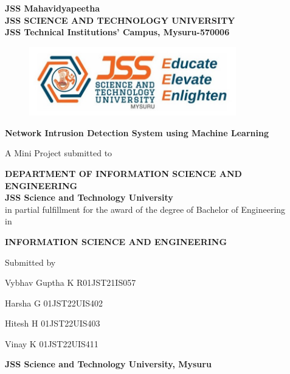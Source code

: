 \thispagestyle{empty}
\begin{center}
    { \large {\bfseries {JSS Mahavidyapeetha \\
    JSS SCIENCE AND TECHNOLOGY UNIVERSITY \\
    JSS Technical Institutions’ Campus, Mysuru-570006} \par}}
    
    \vspace{2\baselineskip}
    {\begin{figure}[!h] 
	\centering
	\includegraphics[width=90mm]{images/jssstu_logo.jpg} 
     \end{figure}
    }

\vspace{2\baselineskip}
    {\Large \textbf{Network Intrusion Detection System using Machine Learning} \par}

\vspace{2\baselineskip}
    {\small{A Mini Project submitted to} \par}
\vspace{0.5\baselineskip}
    {\small\textbf{DEPARTMENT OF INFORMATION SCIENCE AND ENGINEERING \\ JSS Science and Technology University}\\
    \vspace{1\baselineskip}
    \small{in partial fulfillment for the award of the degree of Bachelor of Engineering\\in}}\par
\vspace{0.5\baselineskip}
    {\large \bf {INFORMATION SCIENCE AND ENGINEERING} \par} 

\vspace{1\baselineskip}
    {{Submitted by} \par}

\vspace{\baselineskip}
    {{\large { Vybhav Guptha K R\quad 01JST21IS057}} \par}\vspace{0.2\baselineskip}
    {\large {\quad Harsha G\hspace{2.7cm} 01JST22UIS402} \par}\vspace{0.2\baselineskip}
    {\large {\quad Hitesh H\hspace{2.8cm} 01JST22UIS403} \par}\vspace{0.2\baselineskip}
    {\large {\quad Vinay K\hspace{2.9cm} 01JST22UIS411} \par}

\vspace{2\baselineskip}
    {\bf\small \MakeUppercase{\mydep} \par}
    {\bf {JSS Science and Technology University, Mysuru} \par \myyear}
 \end{center}
